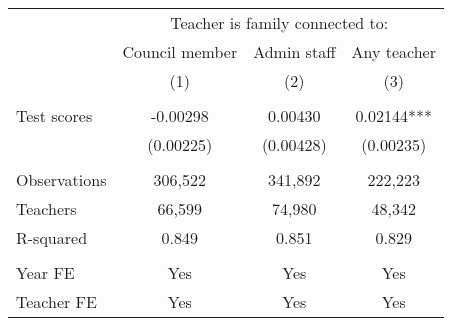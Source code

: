 \setlength{\pdfpagewidth}{8.5in} \setlength{\pdfpageheight}{11in}

\begin{tabular}{lccc} \hline
 & \multicolumn{3}{c}{Teacher is family connected to:} \\
  & Council member & Admin staff & Any teacher \\
 & (1) & (2) & (3) \\
  \hline
  &  &  &  \\
Test scores & -0.00298 & 0.00430 & 0.02144*** \\
 & (0.00225) & (0.00428) & (0.00235) \\
 &  &  &  \\
Observations & 306,522 & 341,892 & 222,223 \\
Teachers & 66,599 & 74,980 & 48,342 \\
R-squared & 0.849 & 0.851 & 0.829 \\
 &  &  &  \\
Year FE & Yes & Yes & Yes \\
 Teacher FE & Yes & Yes & Yes \\ \hline
\end{tabular}


